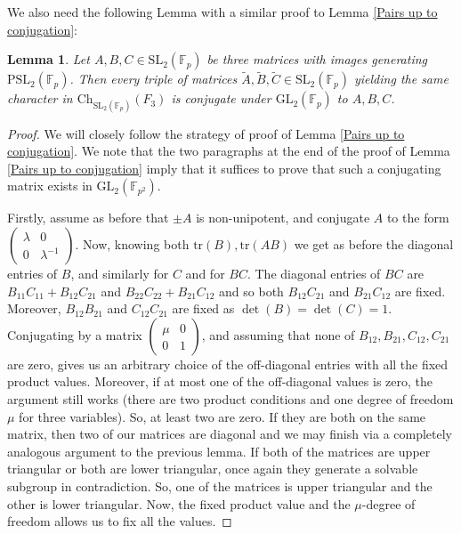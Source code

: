 \documentclass[letterpaper]{amsart}
\newtheorem{lemma}[theorem]{Lemma}
\begin{document}
We also need the following Lemma with a similar proof to Lemma \ref{Pairs up to conjugation}:
\begin{lemma}
\label{Triples up to conjugation}
    Let $A,B,C \in \mathrm{SL}_2(\mathbb{F}_p)$ be three matrices with images generating $\mathrm{PSL}_2(\mathbb{F}_p)$. Then every triple of matrices $\tilde{A},\tilde{B},\tilde{C} \in \mathrm{SL}_2(\mathbb{F}_p)$ yielding the same character in $\mathrm{Ch}_{\mathrm{SL}_2(\mathbb{F}_p)}(F_3)$ is conjugate under $\mathrm{GL}_2(\mathbb{F}_p)$ to $A,B,C$.
\end{lemma}
\begin{proof}
    We will closely follow the strategy of proof of Lemma \ref{Pairs up to conjugation}. We note that the two paragraphs at the end of the proof of Lemma \ref{Pairs up to conjugation} imply that it suffices to prove that such a conjugating matrix exists in $\mathrm{GL}_2(\mathbb{F}_{p^2}).$

    Firstly, assume as before that $\pm A$ is non-unipotent, and conjugate $A$ to the form $\begin{pmatrix}\lambda &  0 \\ 0 & \lambda^{-1}\end{pmatrix}.$ Now, knowing both $\mathrm{tr}(B),\mathrm{tr}(AB)$ we get as before the diagonal entries of $B$, and similarly for $C$ and for $BC$. The diagonal entries of $BC$ are $B_{11}C_{11} + B_{12}C_{21}$ and $B_{22}C_{22} + B_{21}C_{12}$ and so both $B_{12}C_{21}$ and $B_{21}C_{12}$ are fixed. Moreover, $B_{12}B_{21}$ and $C_{12}C_{21}$ are fixed as $\det(B)=\det(C)=1$. Conjugating by a matrix $\begin{pmatrix}\mu & 0 \\ 0 & 1\end{pmatrix}$, and assuming that none of $B_{12},B_{21},C_{12},C_{21}$ are zero, gives us an arbitrary choice of the off-diagonal entries with all the fixed product values. Moreover, if at most one of the off-diagonal values is zero, the argument still works (there are two product conditions and one degree of freedom $\mu$ for three variables). So, at least two are zero. If they are both on the same matrix, then two of our matrices are diagonal and we may finish via a completely analogous argument to the previous lemma. If both of the matrices are upper triangular or both are lower triangular, once again they generate a solvable subgroup in contradiction. So, one of the matrices is upper triangular and the other is lower triangular. Now, the fixed product value and the $\mu$-degree of freedom allows us to fix all the values.


\end{proof}
\end{document}
